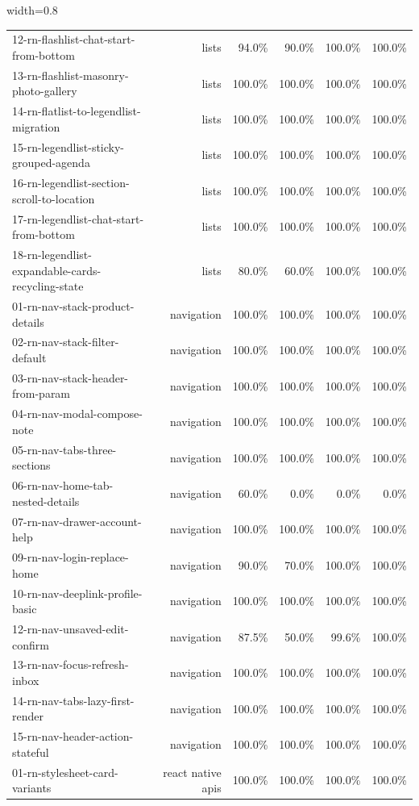 \begin{table}[htbp]
\begin{adjustbox}{width=0.8\textwidth}
\begin{tabular}{lrrrrr}
12-rn-flashlist-chat-start-from-bottom & lists & 94.0\% & 90.0\% & 100.0\% & 100.0\% \\
13-rn-flashlist-masonry-photo-gallery & lists & 100.0\% & 100.0\% & 100.0\% & 100.0\% \\
14-rn-flatlist-to-legendlist-migration & lists & 100.0\% & 100.0\% & 100.0\% & 100.0\% \\
15-rn-legendlist-sticky-grouped-agenda & lists & 100.0\% & 100.0\% & 100.0\% & 100.0\% \\
16-rn-legendlist-section-scroll-to-location & lists & 100.0\% & 100.0\% & 100.0\% & 100.0\% \\
17-rn-legendlist-chat-start-from-bottom & lists & 100.0\% & 100.0\% & 100.0\% & 100.0\% \\
18-rn-legendlist-expandable-cards-recycling-state & lists & 80.0\% & 60.0\% & 100.0\% & 100.0\% \\
01-rn-nav-stack-product-details & navigation & 100.0\% & 100.0\% & 100.0\% & 100.0\% \\
02-rn-nav-stack-filter-default & navigation & 100.0\% & 100.0\% & 100.0\% & 100.0\% \\
03-rn-nav-stack-header-from-param & navigation & 100.0\% & 100.0\% & 100.0\% & 100.0\% \\
04-rn-nav-modal-compose-note & navigation & 100.0\% & 100.0\% & 100.0\% & 100.0\% \\
05-rn-nav-tabs-three-sections & navigation & 100.0\% & 100.0\% & 100.0\% & 100.0\% \\
06-rn-nav-home-tab-nested-details & navigation & 60.0\% & 0.0\% & 0.0\% & 0.0\% \\
07-rn-nav-drawer-account-help & navigation & 100.0\% & 100.0\% & 100.0\% & 100.0\% \\
09-rn-nav-login-replace-home & navigation & 90.0\% & 70.0\% & 100.0\% & 100.0\% \\
10-rn-nav-deeplink-profile-basic & navigation & 100.0\% & 100.0\% & 100.0\% & 100.0\% \\
12-rn-nav-unsaved-edit-confirm & navigation & 87.5\% & 50.0\% & 99.6\% & 100.0\% \\
13-rn-nav-focus-refresh-inbox & navigation & 100.0\% & 100.0\% & 100.0\% & 100.0\% \\
14-rn-nav-tabs-lazy-first-render & navigation & 100.0\% & 100.0\% & 100.0\% & 100.0\% \\
15-rn-nav-header-action-stateful & navigation & 100.0\% & 100.0\% & 100.0\% & 100.0\% \\
01-rn-stylesheet-card-variants & react native apis & 100.0\% & 100.0\% & 100.0\% & 100.0\% \\

\end{tabular}
\end{adjustbox}
\end{table}
